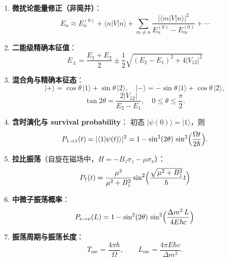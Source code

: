 \begin{formulabox}[核心公式]
\begin{enumerate}[label=\textbf{(\arabic*)}]
    \item \textbf{微扰论能量修正（非简并）}：
    \[
    E_n\approx E_n^{(0)}+\langle n|V|n\rangle+\sum_{m\neq n}\frac{|\langle m|V|n\rangle|^2}{E_n^{(0)}-E_m^{(0)}}+\cdots
    \]

    \item \textbf{二能级精确本征值}：
    \[
    E_{\pm}=\frac{E_1+E_2}{2}\pm\frac{1}{2}\sqrt{(E_2-E_1)^2+4|V_{12}|^2}
    \]

    \item \textbf{混合角与精确本征态}：
    \[
    |+\rangle=\cos\theta\,|1\rangle+\sin\theta\,|2\rangle,\quad
    |-\rangle=-\sin\theta\,|1\rangle+\cos\theta\,|2\rangle,
    \]
    \[
    \tan2\theta=\frac{2|V_{12}|}{E_2-E_1},\quad 0\leq\theta\leq\frac{\pi}{2}.
    \]

    \item \textbf{含时演化与 survival probability}：
    初态 $|\psi(0)\rangle=|1\rangle$，则
    \[
    P_{1\to1}(t)=|\langle1|\psi(t)\rangle|^2=1-\sin^2(2\theta)\,\sin^2\Bigl(\frac{\Omega t}{2\hbar}\Bigr).
    \]

    \item \textbf{拉比振荡}（自旋在磁场中，$H=-B_z\sigma_z-\mu\sigma_x$）：
    \[
    P_{\uparrow}(t)=\frac{\mu^2}{\mu^2+B_z^2}\sin^2\Bigl(\frac{\sqrt{\mu^2+B_z^2}}{\hbar}t\Bigr)
    \]

    \item \textbf{中微子振荡概率}：
    \[
    P_{e\to e}(L)=1-\sin^2(2\theta)\,\sin^2\Bigl(\frac{\Delta m^2\,L}{4E\hbar c}\Bigr)
    \]

    \item \textbf{振荡周期与振荡长度}：
    \[
    T_{\text{osc}}=\frac{4\pi\hbar}{\Omega},\qquad
    L_{\text{osc}}=\frac{4\pi E\hbar c}{\Delta m^2}.
    \]
\end{enumerate}
\end{formulabox}

